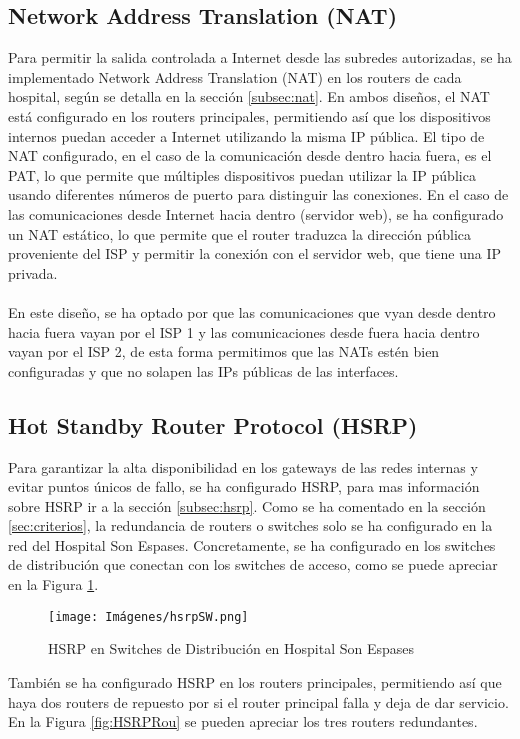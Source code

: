 \subsection{Network Address Translation (NAT)}
Para permitir la salida controlada a Internet desde las subredes autorizadas, se ha implementado Network Address Translation (NAT) en los routers de cada hospital, 
según se detalla en la sección \ref{subsec:nat}. En ambos diseños, el NAT está configurado en los routers principales, permitiendo así que los dispositivos internos puedan acceder a Internet utilizando la misma IP pública. El tipo de 
NAT configurado, en el caso de la comunicación desde dentro hacia fuera, es el PAT, lo que permite que múltiples dispositivos puedan utilizar la IP pública usando diferentes números de puerto para distinguir las conexiones. En el caso de las comunicaciones desde Internet hacia dentro (servidor web), se ha configurado un NAT estático, lo que permite que 
el router traduzca la dirección pública proveniente del ISP y permitir la conexión con el servidor web, que tiene una IP privada.
\\ \\
En este diseño, se ha optado por que las comunicaciones que vyan desde dentro hacia fuera vayan por el ISP 1 y las comunicaciones desde fuera hacia dentro vayan por el ISP 2, de esta forma 
permitimos que las NATs estén bien configuradas y que no solapen las IPs públicas de las interfaces.
\subsection{Hot Standby Router Protocol (HSRP)}
Para garantizar la alta disponibilidad en los gateways de las redes internas y evitar puntos únicos de fallo, se ha configurado HSRP, para mas información sobre HSRP ir a la sección \ref{subsec:hsrp}. 
Como se ha comentado en la sección \ref{sec:criterios}, la redundancia de routers o switches solo se ha configurado en la red del Hospital Son Espases. Concretamente, se ha configurado en los switches de distribución 
que conectan con los switches de acceso, como se puede apreciar en la Figura \ref{fig:HSRPSW}.

\begin{figure}[H]
    \centering
    \texttt{[image: Imágenes/hsrpSW.png]}
    \caption{HSRP en Switches de Distribución en Hospital Son Espases}
    \label{fig:HSRPSW}
\end{figure}

También se ha configurado HSRP en los routers principales, permitiendo así que haya dos routers de repuesto por si el router principal falla y deja de dar servicio. En la Figura \ref{fig:HSRPRou} 
se pueden apreciar los tres routers redundantes.

